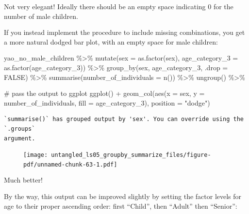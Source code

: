 \documentclass[
  letterpaper,
  DIV=11,
  numbers=noendperiod]{scrreprt}
\newenvironment{Shaded}{\begin{snugshade}}{\end{snugshade}}
\newcommand{\AttributeTok}[1]{\textcolor[rgb]{0.40,0.45,0.13}{#1}}
\newcommand{\CommentTok}[1]{\textcolor[rgb]{0.37,0.37,0.37}{#1}}
\newcommand{\ConstantTok}[1]{\textcolor[rgb]{0.56,0.35,0.01}{#1}}
\newcommand{\FunctionTok}[1]{\textcolor[rgb]{0.28,0.35,0.67}{#1}}
\newcommand{\NormalTok}[1]{\textcolor[rgb]{0.00,0.23,0.31}{#1}}
\newcommand{\SpecialCharTok}[1]{\textcolor[rgb]{0.37,0.37,0.37}{#1}}
\newcommand{\StringTok}[1]{\textcolor[rgb]{0.13,0.47,0.30}{#1}}
\begin{document}
\begin{tcolorbox}
\begin{figure}[H]
{}

\end{figure}

Not very elegant! Ideally there should be an empty space indicating 0
for the number of male children.

If you instead implement the procedure to include missing combinations,
you get a more natural dodged bar plot, with an empty space for male
children:

\begin{Shaded}
\begin{Highlighting}[]
\NormalTok{yao\_no\_male\_children }\SpecialCharTok{\%\textgreater{}\%} 
  \FunctionTok{mutate}\NormalTok{(}\AttributeTok{sex =} \FunctionTok{as.factor}\NormalTok{(sex), }
         \AttributeTok{age\_category\_3 =} \FunctionTok{as.factor}\NormalTok{(age\_category\_3)) }\SpecialCharTok{\%\textgreater{}\%} 
  \FunctionTok{group\_by}\NormalTok{(sex, age\_category\_3, }\AttributeTok{.drop =} \ConstantTok{FALSE}\NormalTok{) }\SpecialCharTok{\%\textgreater{}\%} 
  \FunctionTok{summarise}\NormalTok{(}\AttributeTok{number\_of\_individuals =} \FunctionTok{n}\NormalTok{()) }\SpecialCharTok{\%\textgreater{}\%} 
  \FunctionTok{ungroup}\NormalTok{() }\SpecialCharTok{\%\textgreater{}\%} 
  
  \CommentTok{\# pass the output to ggplot}
  \FunctionTok{ggplot}\NormalTok{() }\SpecialCharTok{+} 
  \FunctionTok{geom\_col}\NormalTok{(}\FunctionTok{aes}\NormalTok{(}\AttributeTok{x =}\NormalTok{ sex, }\AttributeTok{y =}\NormalTok{ number\_of\_individuals, }\AttributeTok{fill =}\NormalTok{ age\_category\_3), }
           \AttributeTok{position =} \StringTok{"dodge"}\NormalTok{)}
\end{Highlighting}
\end{Shaded}

\begin{verbatim}
`summarise()` has grouped output by 'sex'. You can override using the `.groups`
argument.
\end{verbatim}

\begin{figure}[H]

{\centering \texttt{[image: untangled\_ls05\_groupby\_summarize\_files/figure-pdf/unnamed-chunk-63-1.pdf]}

}

\end{figure}

Much better!

By the way, this output can be improved slightly by setting the factor
levels for age to their proper ascending order: first ``Child'', then
``Adult'' then ``Senior'':


\end{tcolorbox}
\end{document}
